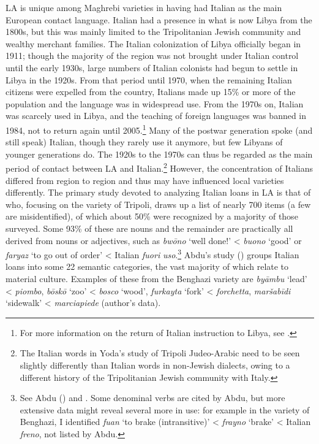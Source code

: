 \documentclass[output=paper]{langsci/langscibook}
\begin{document}
  LA is unique among Maghrebi varieties in having had Italian as the main European contact language. Italian had a presence in what is now Libya from the 1800s, but this was mainly limited to the Tripolitanian Jewish community and wealthy merchant families. The Italian colonization of Libya officially began in 1911; though the majority of the region was not brought under Italian control until the early 1930s, large numbers of Italian colonists had begun to settle in Libya in the 1920s. From that period until 1970, when the remaining Italian citizens were expelled from the country, Italians made up 15\% or more of the population and the language was in widespread use. From the 1970s on, Italian was scarcely used in Libya, and the teaching of foreign languages was banned in 1984, not to return again until 2005.\footnote{For more information on the return of Italian instruction to Libya, see \citet{Danna2018phonetic}.} Many of the postwar generation spoke (and still speak) Italian, though they rarely use it anymore, but few Libyans of younger generations do. The 1920s to the 1970s can thus be regarded as the main period of contact between LA and Italian.\footnote{The Italian words in Yoda’s study of Tripoli Judeo-Arabic \citep{Yoda2005} need to be seen slightly differently than Italian words in non-Jewish dialects, owing to a different history of the Tripolitanian Jewish community with Italy.} However, the concentration of Italians differed from region to region and thus may have influenced local varieties differently. The primary study devoted to analyzing Italian loans in LA is that of \citet{Abdu1988} who, focusing on the variety of Tripoli, draws up a list of nearly 700 items (a few are misidentified), of which about 50\% were recognized by a majority of those surveyed. Some 93\% of these are nouns and the remainder are practically all derived from nouns or adjectives, such as \textit{bwōno} ‘well done!’ < \textit{buono} ‘good’ or \textit{faryaz} ‘to go out of order’ < Italian \textit{fuori} \textit{uso}.\footnote{See Abdu (\citeyear[271]{Abdu1988}) and \citet{Danna2018phonetic}. Some denominal verbs are cited by Abdu, but more extensive data might reveal several more in use: for example in the variety of Benghazi, I identified \textit{fu{\R}an}  ‘to brake (intransitive)’ < \textit{frayno} ‘brake’ < Italian \textit{freno}, not listed by Abdu.} Abdu’s study (\citeyear[248–268]{Abdu1988}) groups Italian loans into some 22 semantic categories, the vast majority of which relate to material culture. Examples of these from the Benghazi variety are \textit{byāmbu} ‘lead’ < \textit{piombo}, \textit{bōskō} ‘zoo’ < \textit{bosco} `wood', \textit{furkayta} ‘fork’ < \textit{forchetta}, \textit{maršabīdi} ‘sidewalk’ < \textit{marciapiede} (author’s data).
\end{document}

